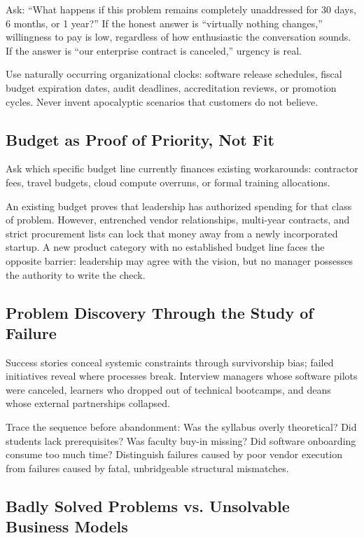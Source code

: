 Ask: ``What happens if this problem remains completely unaddressed for 30 days, 6 months, or 1 year?'' If the honest answer is ``virtually nothing changes,'' willingness to pay is low, regardless of how enthusiastic the conversation sounds. If the answer is ``our enterprise contract is canceled,'' urgency is real.

Use naturally occurring organizational clocks: software release schedules, fiscal budget expiration dates, audit deadlines, accreditation reviews, or promotion cycles. Never invent apocalyptic scenarios that customers do not believe.

\subsection{Budget as Proof of Priority, Not Fit}

Ask which specific budget line currently finances existing workarounds: contractor fees, travel budgets, cloud compute overruns, or formal training allocations.

An existing budget proves that leadership has authorized spending for that class of problem. However, entrenched vendor relationships, multi-year contracts, and strict procurement lists can lock that money away from a newly incorporated startup. A new product category with no established budget line faces the opposite barrier: leadership may agree with the vision, but no manager possesses the authority to write the check.

\subsection{Problem Discovery Through the Study of Failure}

Success stories conceal systemic constraints through survivorship bias; failed initiatives reveal where processes break. Interview managers whose software pilots were canceled, learners who dropped out of technical bootcamps, and deans whose external partnerships collapsed.

Trace the sequence before abandonment: Was the syllabus overly theoretical? Did students lack prerequisites? Was faculty buy-in missing? Did software onboarding consume too much time? Distinguish failures caused by poor vendor execution from failures caused by fatal, unbridgeable structural mismatches.

\subsection{Badly Solved Problems vs. Unsolvable Business Models}


